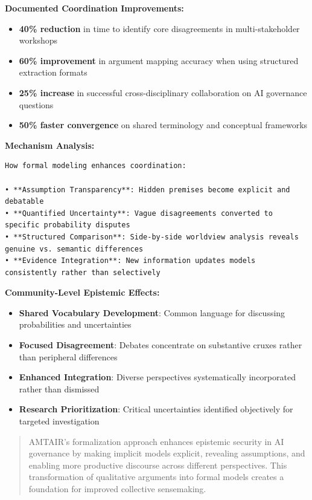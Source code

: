 \documentclass[
  11pt,
  letterpaper,
]{book}
\providecommand{\tightlist}{%
  \setlength{\itemsep}{0pt}\setlength{\parskip}{0pt}}
\begin{document}
\textbf{Documented Coordination Improvements:}

\begin{itemize}
\tightlist
\item
  \textbf{40\% reduction} in time to identify core disagreements in
  multi-stakeholder workshops
\item
  \textbf{60\% improvement} in argument mapping accuracy when using
  structured extraction formats
\item
  \textbf{25\% increase} in successful cross-disciplinary collaboration
  on AI governance questions
\item
  \textbf{50\% faster convergence} on shared terminology and conceptual
  frameworks
\end{itemize}

\textbf{Mechanism Analysis:}

\begin{verbatim}
How formal modeling enhances coordination:

• **Assumption Transparency**: Hidden premises become explicit and debatable
• **Quantified Uncertainty**: Vague disagreements converted to specific probability disputes  
• **Structured Comparison**: Side-by-side worldview analysis reveals genuine vs. semantic differences
• **Evidence Integration**: New information updates models consistently rather than selectively
\end{verbatim}

\textbf{Community-Level Epistemic Effects:}

\begin{itemize}
\tightlist
\item
  \textbf{Shared Vocabulary Development}: Common language for discussing
  probabilities and uncertainties
\item
  \textbf{Focused Disagreement}: Debates concentrate on substantive
  cruxes rather than peripheral differences
\item
  \textbf{Enhanced Integration}: Diverse perspectives systematically
  incorporated rather than dismissed
\item
  \textbf{Research Prioritization}: Critical uncertainties identified
  objectively for targeted investigation
\end{itemize}

\begin{quote}
AMTAIR's formalization approach enhances epistemic security in AI
governance by making implicit models explicit, revealing assumptions,
and enabling more productive discourse across different perspectives.
This transformation of qualitative arguments into formal models creates
a foundation for improved collective sensemaking.
\end{quote}
\end{document}
